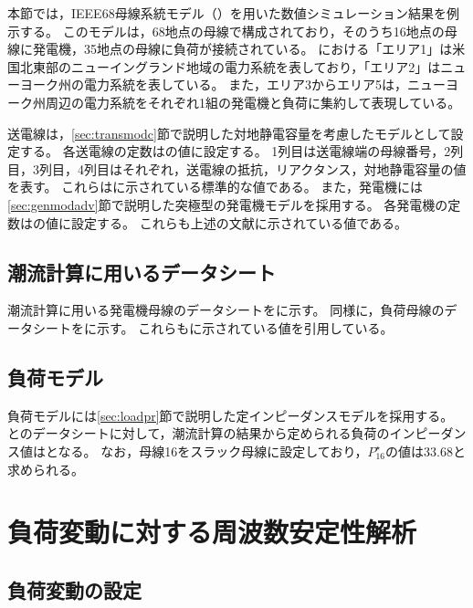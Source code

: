 \documentclass[tombow,dvipdfmx]{corona-a5-1.1}
\begin{document}
本節では，IEEE68母線系統モデル（）を用いた数値シミュレーション結果を例示する。
このモデルは，68地点の母線で構成されており，そのうち16地点の母線に発電機，35地点の母線に負荷が接続されている。
における「エリア1」は米国北東部のニューイングランド地域の電力系統を表しており，「エリア2」はニューヨーク州の電力系統を表している。
また，エリア3からエリア5は，ニューヨーク州周辺の電力系統をそれぞれ1組の発電機と負荷に集約して表現している。



送電線は，\ref{sec:transmodc}節で説明した対地静電容量を考慮したモデルとして設定する。
各送電線の定数はの値に設定する。
1列目は送電線端の母線番号，2列目，3列目，4列目はそれぞれ，送電線の抵抗，リアクタンス，対地静電容量の値を表す。
これらは\cite[Appendix A]{pal2006robust}に示されている標準的な値である。
また，発電機には\ref{sec:genmodadv}節で説明した突極型の発電機モデルを採用する。
各発電機の定数はの値に設定する。
これらも上述の文献に示されている値である。



\subsection{潮流計算に用いるデータシート}


潮流計算に用いる発電機母線のデータシートをに示す。
同様に，負荷母線のデータシートをに示す。
これらも\cite[Appendix A]{pal2006robust}に示されている値を引用している。


\subsection{負荷モデル}

負荷モデルには\ref{sec:loadpr}節で説明した定インピーダンスモデルを採用する。
とのデータシートに対して，潮流計算の結果から定められる負荷のインピーダンス値はとなる。
なお，母線16をスラック母線に設定しており，$P_{16}^{\star}$の値は33.68と求められる。





\section{負荷変動に対する周波数安定性解析}\label{sec:IEEE68AGC}

\subsection{負荷変動の設定}
\end{document}
